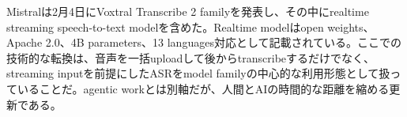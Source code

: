 Mistralは2月4日にVoxtral Transcribe 2 familyを発表し、その中にrealtime streaming speech-to-text modelを含めた。Realtime modelはopen weights、Apache 2.0、4B parameters、13 languages対応として記載されている。ここでの技術的な転換は、音声を一括uploadして後からtranscribeするだけでなく、streaming inputを前提にしたASRをmodel familyの中心的な利用形態として扱っていることだ。agentic workとは別軸だが、人間とAIの時間的な距離を縮める更新である。\autocite{src-d8b7c1c36830}


